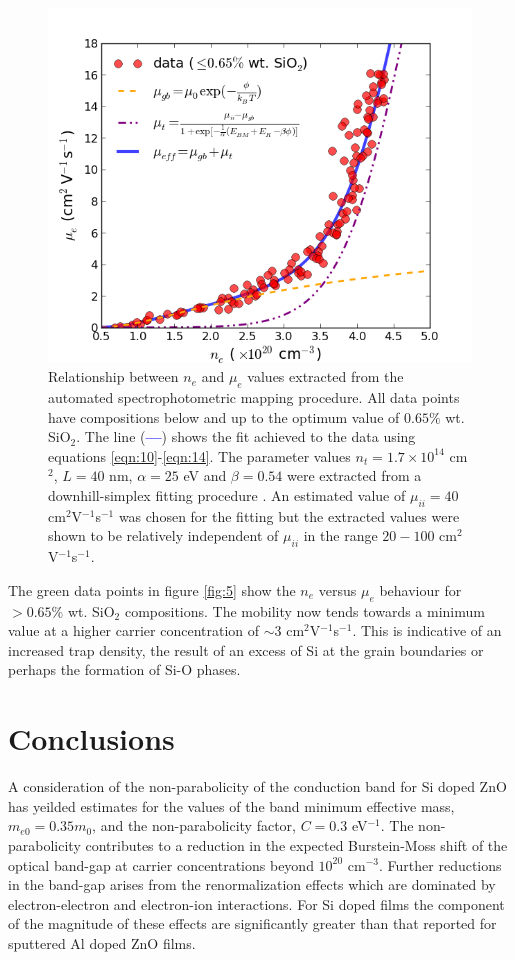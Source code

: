 \documentclass[final,5p,times]{elsarticle}
\begin{document}
\begin{figure}[tb!]
\centering
\includegraphics[width=1.0\columnwidth]{figure7.png}
\caption{\label{fig:7} Relationship between $n_e$ and $\mu_e$ values extracted from the automated spectrophotometric mapping procedure. All data points have compositions below and up to the optimum value of $0.65\%$ wt. SiO$_{2}$. The line (\textcolor{blue}{\textbf{---}}) shows the fit achieved to the data using equations \ref{eqn:10}-\ref{eqn:14}. The parameter values $n_t = 1.7\times10^{14}$ cm$^2$, $L = 40$ nm, $\alpha=25$ eV and $\beta = 0.54$ were extracted from a downhill-simplex fitting procedure \cite{Nelder1965}. An estimated value of $\mu_{ii} = 40$ cm$^2$V$^{-1}$s$^{-1}$ was chosen for the fitting but the extracted values were shown to be relatively independent of $\mu_{ii}$ in the range $20 - 100$ cm$^2$V$^{-1}$s$^{-1}$.}
\end{figure}
The green data points in figure \ref{fig:5} show the $n_e$ versus $\mu_e$ behaviour for $>0.65\%$ wt. SiO$_2$ compositions. The mobility now tends towards a minimum value at a higher carrier concentration of $\sim 3$ cm$^{2}$V$^{-1}$s$^{-1}$. This is indicative of an increased trap density, the result of an excess of Si at the grain boundaries or perhaps the formation of Si-O phases.  

\section{Conclusions}
\label{sec:4}
A consideration of the non-parabolicity of the conduction band for Si doped ZnO has yeilded estimates for the values of the band minimum effective mass, $m_{e0} =0.35m_0$, and the non-parabolicity factor, $C=0.3$ eV$^{-1}$. The non-parabolicity contributes to a reduction in the expected Burstein-Moss shift of the optical band-gap at carrier concentrations beyond $10^{20}$ cm$^{-3}$. Further reductions in the band-gap arises from the renormalization effects which are dominated by electron-electron and electron-ion interactions. For Si doped films the component of the magnitude of these effects are significantly greater than that reported for sputtered Al doped ZnO films.
\end{document}
